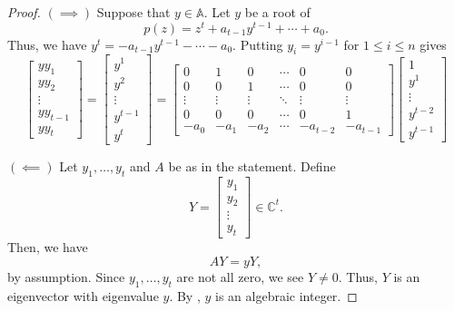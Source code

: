 \begin{proof} 
	$(\implies)$ Suppose that $y \in \mathbb{A}.$ Let $y$ be a root of 
	\begin{equation*} 
		p(z) = z^t + a_{t - 1}y^{t - 1} + \cdots + a_0.
	\end{equation*}
	Thus, we have $y^t = -a_{t - 1}y^{t - 1} - \cdots - a_0.$ Putting $y_i = y^{i - 1}$ for $1 \le i \le n$ gives
	\begin{equation*} 
		\begin{bmatrix}
			yy_1\\
			yy_2\\
			\vdots\\
			yy_{t - 1}\\
			yy_t
		\end{bmatrix} = \begin{bmatrix}
			y^1\\
			y^2\\
			\vdots\\
			y^{t - 1}\\
			y^t
		\end{bmatrix} = \begin{bmatrix}
			0 & 1 & 0 & \cdots & 0 & 0\\
			0 & 0 & 1 & \cdots & 0 & 0\\
			\vdots & \vdots & \vdots & \ddots & \vdots & \vdots\\
			0 & 0 & 0 & \cdots & 0 & 1\\
			-a_0 & -a_1 & -a_2 & \cdots & -a_{t - 2} & -a_{t - 1}
		\end{bmatrix}\begin{bmatrix}
			1\\
			y^1\\
			\vdots\\
			y^{t - 2}\\
			y^{t - 1}
		\end{bmatrix}
	\end{equation*}

	$(\impliedby)$ Let $y_1, \ldots, y_t$ and $A$ be as in the statement. Define 
	\begin{equation*} 
		Y = \begin{bmatrix}
			y_1\\
			y_2\\
			\vdots\\
			y_t
		\end{bmatrix} \in \mathbb{C}^t.
	\end{equation*}
	Then, we have
	\begin{equation*} 
		AY = yY,
	\end{equation*}
	by assumption. Since $y_1, \ldots, y_t$ are not all zero, we see $Y \neq 0.$ Thus, $Y$ is an eigenvector with eigenvalue $y.$ By , $y$ is an algebraic integer.
\end{proof}	

